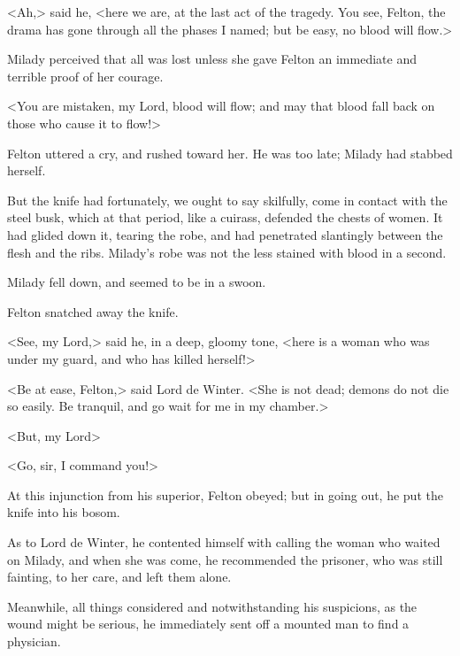 <Ah,> said he, <here we are, at the last act of the tragedy. You see, Felton, the drama has gone through all the phases I named; but be easy, no blood will flow.> 

Milady perceived that all was lost unless she gave Felton an immediate and terrible proof of her courage. 

<You are mistaken, my Lord, blood will flow; and may that blood fall back on those who cause it to flow!> 

Felton uttered a cry, and rushed toward her. He was too late; Milady had stabbed herself. 

But the knife had fortunately, we ought to say skilfully, come in contact with the steel busk, which at that period, like a cuirass, defended the chests of women. It had glided down it, tearing the robe, and had penetrated slantingly between the flesh and the ribs. Milady's robe was not the less stained with blood in a second. 

Milady fell down, and seemed to be in a swoon. 

Felton snatched away the knife. 

<See, my Lord,> said he, in a deep, gloomy tone, <here is a woman who was under my guard, and who has killed herself!> 

<Be at ease, Felton,> said Lord de Winter. <She is not dead; demons do not die so easily. Be tranquil, and go wait for me in my chamber.> 

<But, my Lord\longdash> 

<Go, sir, I command you!> 

At this injunction from his superior, Felton obeyed; but in going out, he put the knife into his bosom. 

As to Lord de Winter, he contented himself with calling the woman who waited on Milady, and when she was come, he recommended the prisoner, who was still fainting, to her care, and left them alone. 

Meanwhile, all things considered and notwithstanding his suspicions, as the wound might be serious, he immediately sent off a mounted man to find a physician.